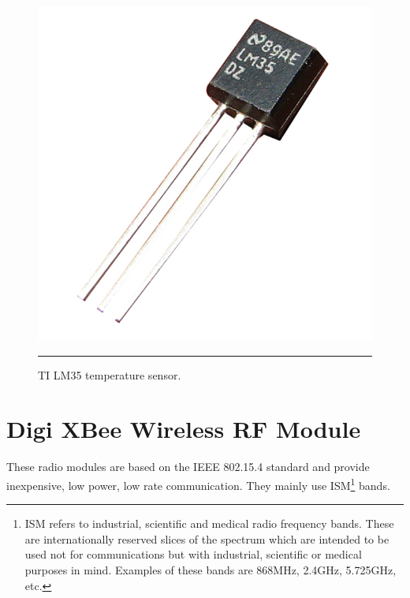 \begin{figure}[htbp]
    \centering
        \includegraphics[scale=0.6]{./Figures/LM35.jpg}
        \rule{35em}{0.5pt}
    \caption[TI LM35 temperature sensor]{TI LM35 temperature sensor.}
    \label{fig:lm35}
\end{figure}


\section{Digi XBee\textregistered{} Wireless RF Module}
\label{sec:xbee}

These radio modules are based on the IEEE 802.15.4 standard and provide inexpensive, low power, low rate communication. They mainly use ISM\footnote{ISM refers to industrial, scientific and medical radio frequency bands. These are internationally reserved slices of the spectrum which are intended to be used not for communications but with industrial, scientific or medical purposes in mind. Examples of these bands are 868MHz, 2.4GHz, 5.725GHz, etc.} bands. 

